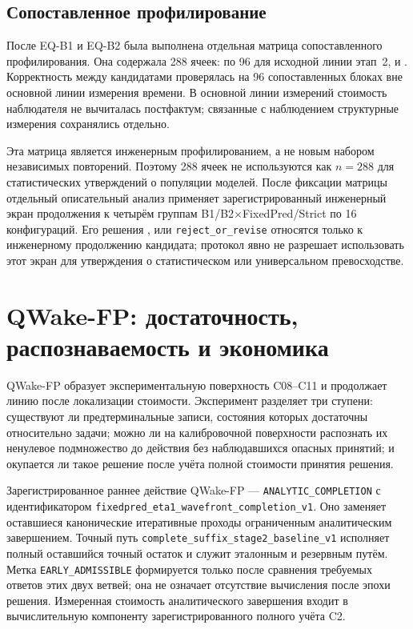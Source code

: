 \subsection{Сопоставленное профилирование}

После EQ-B1 и EQ-B2 была выполнена отдельная матрица сопоставленного
профилирования. Она содержала 288 ячеек: по 96 для исходной линии этап~2,
 и . Корректность между
кандидатами проверялась на 96 сопоставленных блоках вне основной линии измерения
времени. В основной линии измерений стоимость наблюдателя не вычиталась
постфактум; связанные с наблюдением структурные измерения сохранялись отдельно.

Эта матрица является инженерным профилированием, а не новым набором независимых
повторений. Поэтому 288 ячеек не используются как $n=288$ для статистических
утверждений о популяции моделей. После фиксации матрицы отдельный описательный
анализ применяет зарегистрированный инженерный экран продолжения к четырём
группам B1/B2×FixedPred/Strict по 16 конфигураций. Его решения
,  или \texttt{reject\_or\_revise} относятся только
к инженерному продолжению кандидата; протокол явно не разрешает использовать
этот экран для утверждения о статистическом или универсальном превосходстве.

\section{QWake-FP: достаточность, распознаваемость и экономика}
\label{sec:qwake-experiment}

QWake-FP образует экспериментальную поверхность C08--C11 и продолжает линию
после локализации стоимости. Эксперимент разделяет три ступени: существуют ли предтерминальные записи, состояния которых достаточны относительно
задачи; можно ли на калибровочной поверхности распознать их ненулевое
подмножество до действия без наблюдавшихся опасных принятий; и окупается ли
такое решение после учёта полной стоимости принятия решения.

Зарегистрированное раннее действие QWake-FP --- \texttt{ANALYTIC\_COMPLETION}
с идентификатором \nolinkurl{fixedpred_eta1_wavefront_completion_v1}.
Оно заменяет оставшиеся канонические итеративные проходы ограниченным аналитическим
завершением. Точный путь \nolinkurl{complete_suffix_stage2_baseline_v1}
исполняет полный оставшийся точный остаток и служит эталонным и резервным путём.
Метка \texttt{EARLY\_ADMISSIBLE} формируется только после сравнения требуемых
ответов этих двух ветвей; она не означает отсутствие вычисления после эпохи
решения. Измеренная стоимость аналитического завершения входит в вычислительную
компоненту зарегистрированного полного учёта C2.

